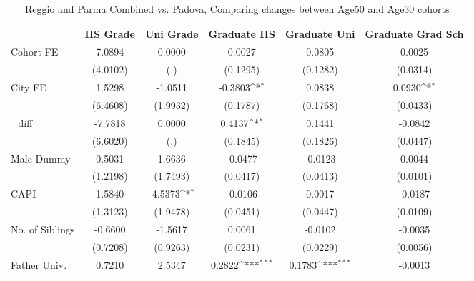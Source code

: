 \begin{table}[htbp]\centering
\def\sym#1{\ifmmode^{#1}\else\(^{#1}\)\fi}
\caption{Reggio and Parma Combined vs. Padova, Comparing changes between Age50 and Age30 cohorts}
\begin{tabular}{l*{5}{c}}
\toprule
            &\multicolumn{1}{c}{HS Grade}&\multicolumn{1}{c}{Uni Grade}&\multicolumn{1}{c}{Graduate HS}&\multicolumn{1}{c}{Graduate Uni}&\multicolumn{1}{c}{Graduate Grad Sch}\\
\midrule
Cohort FE   &      7.0894         &      0.0000         &      0.0027         &      0.0805         &      0.0025         \\
            &    (4.0102)         &         (.)         &    (0.1295)         &    (0.1282)         &    (0.0314)         \\
\addlinespace
City FE     &      1.5298         &     -1.0511         &     -0.3803\sym{*}  &      0.0838         &      0.0930\sym{*}  \\
            &    (6.4608)         &    (1.9932)         &    (0.1787)         &    (0.1768)         &    (0.0433)         \\
\addlinespace
\_diff       &     -7.7818         &      0.0000         &      0.4137\sym{*}  &      0.1441         &     -0.0842         \\
            &    (6.6020)         &         (.)         &    (0.1845)         &    (0.1826)         &    (0.0447)         \\
\addlinespace
Male Dummy  &      0.5031         &      1.6636         &     -0.0477         &     -0.0123         &      0.0044         \\
            &    (1.2198)         &    (1.7493)         &    (0.0417)         &    (0.0413)         &    (0.0101)         \\
\addlinespace
CAPI        &      1.5840         &     -4.5373\sym{*}  &     -0.0106         &      0.0017         &     -0.0187         \\
            &    (1.3123)         &    (1.9478)         &    (0.0451)         &    (0.0447)         &    (0.0109)         \\
\addlinespace
No. of Siblings&     -0.6600         &     -1.5617         &      0.0061         &     -0.0102         &     -0.0035         \\
            &    (0.7208)         &    (0.9263)         &    (0.0231)         &    (0.0229)         &    (0.0056)         \\
\addlinespace
Father Univ.&      0.7210         &      2.5347         &      0.2822\sym{***}&      0.1783\sym{***}&     -0.0013         \\

\end{tabular}
\end{table}
